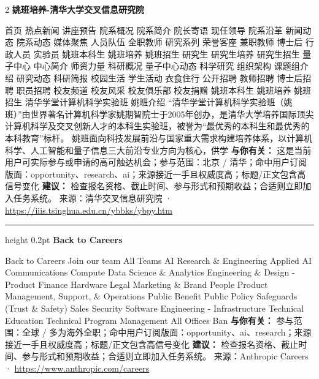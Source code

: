 \documentclass[10.5pt]{ctexart}
\begin{document}
\begin{multicols}{2}
{\large\bfseries 姚班培养-清华大学交叉信息研究院}\par
首页 热点新闻 讲座预告 院系概况 院系简介 院长寄语 现任领导 院系沿革 新闻动态 院系动态 媒体聚焦 人员队伍 全职教师 研究系列 荣誉客座 兼职教师 博士后 行政人员 实验员 姚班本科生 姚班培养 姚班招生 研究生 研究生培养 研究生招生 量子中心 中心简介 师资力量 科研概况 量子中心动态 科学研究 组织架构 课题组介绍 研究动态 科研简报 校园生活 学生活动 衣食住行 公开招聘 教师招聘 博士后招聘 职员招聘 校友频道 校友风采 校友俱乐部 校友捐赠 姚班本科生 姚班培养 姚班招生 清华学堂计算机科学实验班 姚班介绍 “清华学堂计算机科学实验班（姚班）”由世界著名计算机科学家姚期智院士于2005年创办，是清华大学培养国际顶尖计算机科学及交叉创新人才的本科生实验班，被誉为“最优秀的本科生和最优秀的本科教育”标杆。 姚班面向科技发展前沿与国家重大需求构建培养体系，以计算机科学、人工智能和量子信息三大前沿专业方向为核心，供学
\textbf{与你有关：} 这是当前用户可实际参与或申请的高可触达机会；参与范围：北京 / 清华；命中用户订阅版面：opportunity、research、ai；来源接近一手且权威度高；标题/正文包含高信号变化
\textbf{建议：} 检查报名资格、截止时间、参与形式和预期收益；合适则立即加入任务系统。
{\footnotesize\color{ormuted} 来源：清华交叉信息研究院 · \url{https://iiis.tsinghua.edu.cn/ybbks/ybpy.htm}}
\vspace{2mm}
\hrule height 0.2pt
\vspace{2mm}
{\large\bfseries Back to Careers}\par
Back to Careers Join our team All Teams AI Research \& Engineering Applied AI Communications Compute Data Science \& Analytics Engineering \& Design - Product Finance Hardware Legal Marketing \& Brand People Product Management, Support, \& Operations Public Benefit Public Policy Safeguards (Trust \& Safety) Sales Security Software Engineering - Infrastructure Technical Education Technical Program Management All Offices Ban
\textbf{与你有关：} 参与范围：全球 / 多为海外全职；命中用户订阅版面：opportunity、ai、research；来源接近一手且权威度高；标题/正文包含高信号变化
\textbf{建议：} 检查报名资格、截止时间、参与形式和预期收益；合适则立即加入任务系统。
{\footnotesize\color{ormuted} 来源：Anthropic Careers · \url{https://www.anthropic.com/careers}}
\end{multicols}
\end{document}
